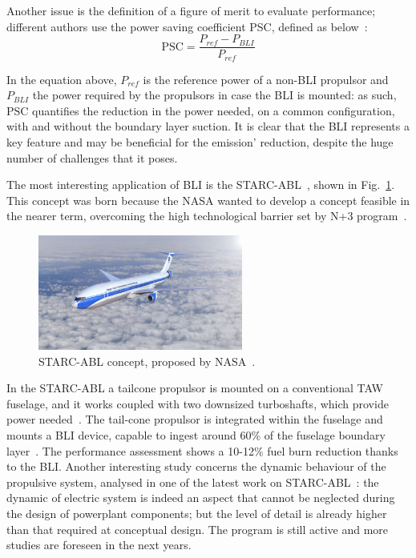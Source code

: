 Another issue is the definition of a figure of merit to evaluate performance; different authors use the power saving coefficient PSC, defined as below~\cite{bib:smith}:
\begin{equation}
	\label{eq:psc_bli}
	\textrm{PSC} = \frac{P_{ref}-P_{BLI}}{P_{ref}}
\end{equation}

In the equation above, $P_{ref}$ is the reference power of a non-BLI propulsor and $P_{BLI}$ the power required by the propulsors in case the BLI is mounted: as such, PSC quantifies the reduction in the power needed, on a common configuration, with and without the boundary layer suction. 
It is clear that the BLI represents a key feature and may be beneficial for the emission' reduction, despite the huge number of challenges that it poses. 

The most interesting application of BLI is the STARC-ABL~\cite{bib:welstead_2016}, shown in Fig.~\ref{fig:starc_abl}. 
This concept was born because the NASA wanted to develop a concept feasible in the nearer term, overcoming the high technological barrier set by N+3 program~\cite{bib:bradley_sugar_p2_v2}. 
\begin{figure}[!h]
	\centering
	\includegraphics[keepaspectratio, width=0.6\textwidth]{images/chap1/starc_abl.jpg}
	\caption{STARC-ABL concept, proposed by NASA~\cite{bib:welstead_2016}.}
	\label{fig:starc_abl}
\end{figure}
In the STARC-ABL a tailcone propulsor is mounted on a conventional \acs{TAW} fuselage, and it works coupled with two downsized turboshafts, which provide power needed~\cite{bib:yoon}.
The tail-cone propulsor is integrated within the fuselage and mounts a BLI device, capable to ingest around 60\% of the fuselage boundary layer~\cite{bib:welstead_2017}. 
The performance assessment shows a 10-12\% fuel burn reduction thanks to the BLI. 
Another interesting study concerns the dynamic behaviour of the propulsive system, analysed in one of the latest work on STARC-ABL~\cite{bib:kratz}: the dynamic of electric system is indeed an aspect that cannot be neglected during the design of powerplant components; but the level of detail is already higher than that required at conceptual design. 
The program is still active and more studies are foreseen in the next years.

